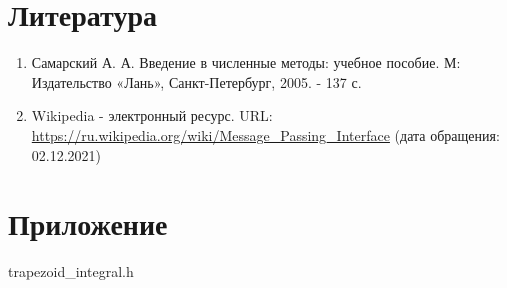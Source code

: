 \documentclass{report}
\begin{document}
\section*{Литература}
\begin{enumerate}
\item Самарский А. А. Введение в численные методы: учебное пособие. М: Издательство «Лань», Санкт-Петербург, 2005. - 137 с.
\item Wikipedia - электронный ресурс. URL: \url{https://ru.wikipedia.org/wiki/Message_Passing_Interface} (дата обращения: 02.12.2021)
\end{enumerate} 
\newpage

\section*{Приложение}
\par trapezoid\_integral.h
\end{document}
